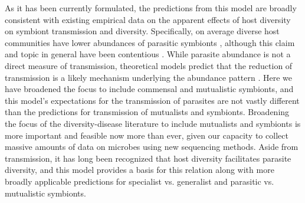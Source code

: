 As it has been currently formulated, the predictions from this model are broadly consistent with existing empirical data on the apparent effects of host diversity on symbiont transmission and diversity.
Specifically, on average diverse host communities have lower abundances of parasitic symbionts \citep{Civitello2015}, although this claim and topic in general have been contentious \citep{Salkeld2013,Lafferty2012}.
While parasite abundance is not a direct measure of transmission, theoretical models predict that the reduction of transmission is a likely mechanism underlying the abundance pattern \citep{Dobson2004, Rudolf2005, Mihaljevic2014}. %
Here we have broadened the focus to include commensal and mutualistic symbionts, and this model's expectations for the transmission of parasites are not vastly different than the predictions for transmission of mutualists and symbionts.
Broadening the focus of the diversity-disease literature to include mutualists and symbionts is more important and feasible now more than ever, given our capacity to collect massive amounts of data on microbes using new sequencing methods. %
Aside from transmission, it has long been recognized that host diversity facilitates parasite diversity, and this model provides a basis for this relation along with more broadly applicable predictions for specialist vs. generalist and parasitic vs. mutualistic symbionts. %

